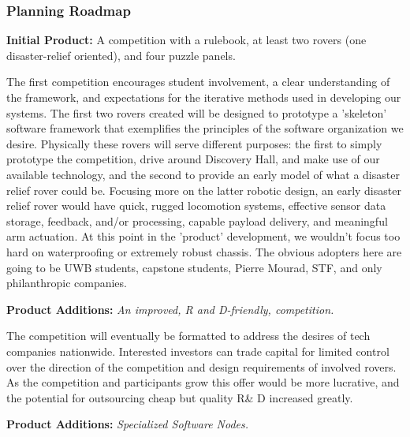 \documentclass[a4paper, 10pt]{article}
\begin{document}
		\subsubsection{Planning Roadmap}
		\textbf{Initial Product:} A competition with a rulebook, at least two rovers (one disaster-relief oriented), and four puzzle panels.
		
		The first competition encourages student involvement, a clear understanding of the framework, and expectations for the iterative methods used in developing our systems.  The first two rovers created will be designed to prototype a 'skeleton' software framework that exemplifies the principles of the software organization we desire. Physically these rovers will serve different purposes: the first to simply prototype the competition, drive around Discovery Hall, and make use of our available technology, and the second to provide an early model of what a disaster relief rover could be. Focusing more on the latter robotic design, an early disaster relief rover would have quick, rugged locomotion systems, effective sensor data storage, feedback, and/or processing, capable payload delivery, and meaningful arm actuation. At this point in the 'product' development, we wouldn't focus too hard on waterproofing or extremely robust chassis. The obvious adopters here are going to be UWB students, capstone students, Pierre Mourad, STF, and only philanthropic companies.
		
		\textbf{Product Additions:} \emph{An improved, R and D-friendly, competition.}

	The competition will eventually be formatted to address the desires of tech companies nationwide. Interested investors can trade capital for limited control over the direction of the competition and design requirements of involved rovers. As the competition and participants grow this offer would be more lucrative, and the potential for outsourcing cheap but quality R\& D increased greatly.

		\textbf{Product Additions:} \emph{Specialized Software Nodes.}
		
\end{document}
